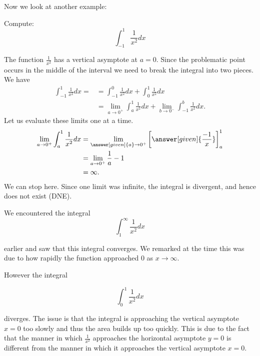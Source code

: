 \documentclass{ximera}
\begin{document}
Now we look at another example: 

\begin{example}	
  Compute:
  \[
  \int_{-1}^1 \frac{1}{x^2} dx
  \]
  \begin{explanation}
    The function $\frac{1}{x^2}$ has a vertical asymptote at $a=0$. Since the problematic point 
occurs in the middle of the interval we need to break the integral into two pieces.
  We have
\begin{align*}
  \int_{-1}^1 \frac{1}{x^2} dx =&= \int_{-1}^{0} \frac{1}{x^2} dx + \int_{0}^{1} \frac{1}{x^2} dx \\
&= \lim_{a \to 0^+} \int_{a}^1 \frac{1}{x^2} dx  + \lim_{b \to 0^-} \int_{-1}^{b} \frac{1}{x^2} dx.
 \end{align*}
  Let us evaluate these limits one at a time.
  \begin{align*}
    \lim_{a \to 0^+} \int_{a}^1 \frac{1}{x^2} dx  &=  \lim_{\answer[given]{a} \to 0^+} \bigg[\answer[given]{\frac{-1}{x}}\bigg]_a^1 \\
    &=  \lim_{a \to 0^+} \frac{1}{a}-1\\
    &= \infty.
  \end{align*}
    We can stop here. Since one limit was infinite, the integral is
    divergent, and hence does not exist (DNE). 
  \end{explanation}
\end{example}

\begin{remark}
We encountered the integral
\[
\int_{1}^{\infty} \frac{1}{x^2} dx 
\]

earlier and saw that this integral converges. We remarked at the time this was due to how rapidly the function approached $0$ as $x \to \infty$. 

However the integral

\[
\int_{0}^{1} \frac{1}{x^2} dx 
\]

diverges. The issue is that the integral is approaching the vertical asymptote $x=0$ too slowly and thus the area builds up too quickly. This is due to the fact that the manner in which $\frac{1}{x^2}$ approaches the horizontal asymptote $y=0$ is different from the manner in which 
it approaches the vertical asymptote $x=0$. 
\end{remark}
\end{document}

